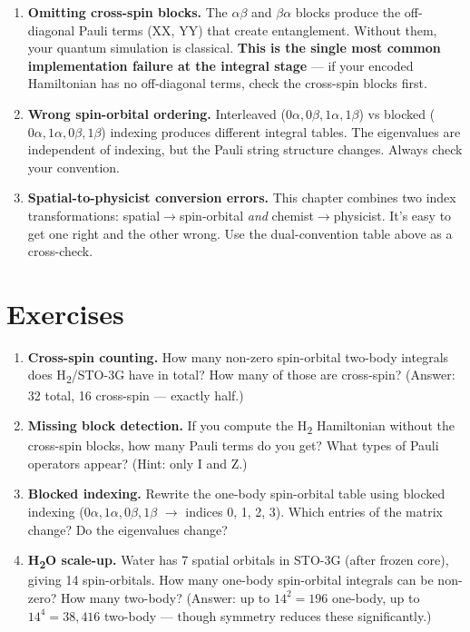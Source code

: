 \documentclass[
  11pt,
  oneside]{book}
\begin{document}
\begin{enumerate}
\def\labelenumi{\arabic{enumi}.}
\item
  \textbf{Omitting cross-spin blocks.} The \(\alpha\beta\) and
  \(\beta\alpha\) blocks produce the off-diagonal Pauli terms (XX, YY)
  that create entanglement. Without them, your quantum simulation is
  classical. \textbf{This is the single most common implementation
  failure at the integral stage} --- if your encoded Hamiltonian has no
  off-diagonal terms, check the cross-spin blocks first.
\item
  \textbf{Wrong spin-orbital ordering.} Interleaved
  (\(0\alpha, 0\beta, 1\alpha, 1\beta\)) vs blocked
  (\(0\alpha, 1\alpha, 0\beta, 1\beta\)) indexing produces different
  integral tables. The eigenvalues are independent of indexing, but the
  Pauli string structure changes. Always check your convention.
\item
  \textbf{Spatial-to-physicist conversion errors.} This chapter combines
  two index transformations: spatial$\rightarrow$spin-orbital \emph{and}
  chemist$\rightarrow$physicist. It's easy to get one right and the other wrong. Use
  the dual-convention table above as a cross-check.
\end{enumerate}

\section{Exercises}\label{exercises-2}

\begin{enumerate}
\def\labelenumi{\arabic{enumi}.}
\item
  \textbf{Cross-spin counting.} How many non-zero spin-orbital two-body
  integrals does H\textsubscript{2}/STO-3G have in total? How many of those are
  cross-spin? (Answer: 32 total, 16 cross-spin --- exactly half.)
\item
  \textbf{Missing block detection.} If you compute the H\textsubscript{2} Hamiltonian
  without the cross-spin blocks, how many Pauli terms do you get? What
  types of Pauli operators appear? (Hint: only I and Z.)
\item
  \textbf{Blocked indexing.} Rewrite the one-body spin-orbital table
  using blocked indexing (\(0\alpha, 1\alpha, 0\beta, 1\beta\) $\rightarrow$ indices
  0, 1, 2, 3). Which entries of the matrix change? Do the eigenvalues
  change?
\item
  \textbf{H\textsubscript{2}O scale-up.} Water has 7 spatial orbitals in STO-3G (after
  frozen core), giving 14 spin-orbitals. How many one-body spin-orbital
  integrals can be non-zero? How many two-body? (Answer: up to
  \(14^2 = 196\) one-body, up to \(14^4 = 38{,}416\) two-body --- though
  symmetry reduces these significantly.)
\end{enumerate}
\end{document}
